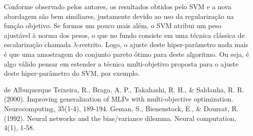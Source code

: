 \documentclass[peerreview]{IEEEtran}
\begin{document}
	Conforme observado pelos autores, os resultados obtidos pelo SVM e a nova abordagem são bem similiares, justamente devido ao uso da regularização na função objetivo. Se formos um pouco mais além, o SVM atribui um peso ajustável à norma dos pesos, o que no fundo consiste em uma técnica clássica de escalarização chamada $\lambda$-restrito. Logo, o ajuste deste hiper-parâmetro nada mais é que uma amostragem do conjunto pareto ótimo para deste algoritmo. Ou seja, é algo válido pensar em estender a técnica multi-objetivo proposta para o ajuste deste hiper-parâmetro do SVM, por exemplo.
		
	

    \begin{thebibliography}{99}
         de Albuquerque Teixeira, R., Braga, A. P., Takahashi, R. H., \& Saldanha, R. R. (2000). Improving generalization of MLPs with multi-objective optimization. Neurocomputing, 35(1-4), 189-194.
         Geman, S., Bienenstock, E., \& Doursat, R. (1992). Neural networks and the bias/variance dilemma. Neural computation, 4(1), 1-58.
    \end{thebibliography}
    
	
\end{document}
